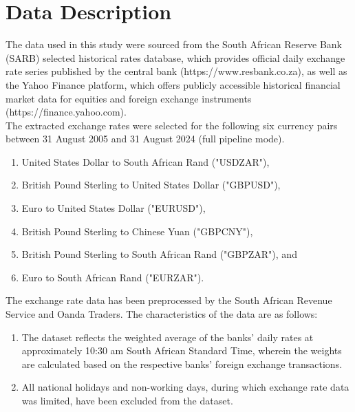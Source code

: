 \documentclass[oneside,12pt]{CUEDthesisPSnPDF}
\begin{document}

\section{Data Description}
\noindent 
The data used in this study were sourced from the South African Reserve Bank (SARB) selected historical rates database, which provides official daily exchange rate series published by the central bank (https://www.resbank.co.za), as well as the Yahoo Finance platform, which offers publicly accessible historical financial market data for equities and foreign exchange instruments (https://finance.yahoo.com).\\

The extracted exchange rates were selected for the following six currency pairs between 31 August 2005 and 31 August 2024 (full pipeline mode).
\begin{enumerate}
    \item United States Dollar to South African Rand ("USDZAR"),
    \item British Pound Sterling to United States Dollar ("GBPUSD"),
    \item Euro to United States Dollar ("EURUSD"),
    \item British Pound Sterling to Chinese Yuan ("GBPCNY"),
    \item British Pound Sterling to South African Rand ("GBPZAR"), and
    \item Euro to South African Rand ("EURZAR").
\end{enumerate}

The exchange rate data has been preprocessed by the South African Revenue Service and Oanda Traders. The characteristics of the data are as follows:
\begin{enumerate}
    \item The dataset reflects the weighted average of the banks' daily rates at approximately 10:30 am South African Standard Time, wherein the weights are calculated based on the respective banks' foreign exchange transactions.
    \item All national holidays and non-working days, during which exchange rate data was limited, have been excluded from the dataset.
\end{enumerate}
\end{document}

